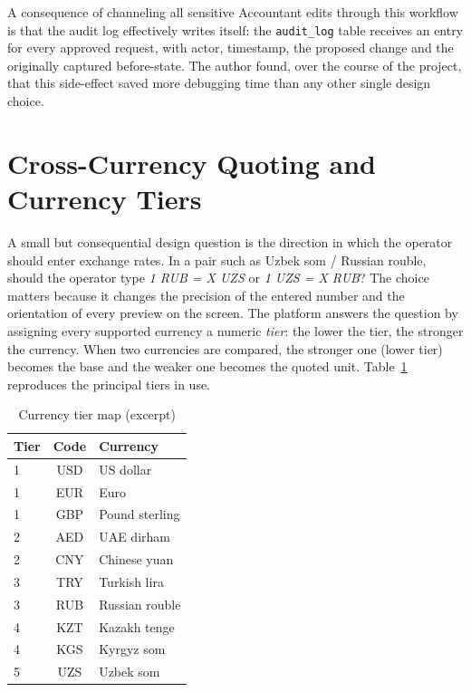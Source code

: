 A consequence of channeling all sensitive Accountant edits through this workflow is that the audit log effectively writes itself: the \texttt{audit\_log} table receives an entry for every approved request, with actor, timestamp, the proposed change and the originally captured before-state. The author found, over the course of the project, that this side-effect saved more debugging time than any other single design choice.

\section{Cross-Currency Quoting and Currency Tiers}
\label{sec:currency}

A small but consequential design question is the direction in which the operator should enter exchange rates. In a pair such as Uzbek som / Russian rouble, should the operator type \emph{1 RUB = X UZS} or \emph{1 UZS = X RUB}? The choice matters because it changes the precision of the entered number and the orientation of every preview on the screen. The platform answers the question by assigning every supported currency a numeric \emph{tier}: the lower the tier, the stronger the currency. When two currencies are compared, the stronger one (lower tier) becomes the base and the weaker one becomes the quoted unit. Table~\ref{tab:tiers} reproduces the principal tiers in use.

{\singlespacing
\begin{table}[h]
  \caption{Currency tier map (excerpt)}
  \label{tab:tiers}
  \centering
  \begin{tabular}{lcl}
    \toprule
    \textbf{Tier} & \textbf{Code} & \textbf{Currency}\\
    \midrule
    1 & USD & US dollar\\
    1 & EUR & Euro\\
    1 & GBP & Pound sterling\\
    2 & AED & UAE dirham\\
    2 & CNY & Chinese yuan\\
    3 & TRY & Turkish lira\\
    3 & RUB & Russian rouble\\
    4 & KZT & Kazakh tenge\\
    4 & KGS & Kyrgyz som\\
    5 & UZS & Uzbek som\\
    \bottomrule
  \end{tabular}
\end{table}
}

